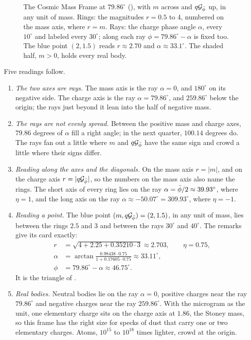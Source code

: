 \begin{figure}[tb]
\myfloatalign

\caption[The Cosmic Mass Frame]{The Cosmic Mass Frame at $79.86^\circ$ (), with $m$ across and $q\mathcal{G}_{\bar{\phi}}$ up, in any unit of mass. Rings: the magnitudes $r = 0.5$ to $4$, numbered on the mass axis, where $r = m$. Rays: the charge phase angle $\alpha$, every $10^\circ$ and labeled every $30^\circ$; along each ray $\phi = 79.86^\circ - \alpha$ is fixed too. The blue point $(2, 1.5)$ reads $r \approx 2.70$ and $\alpha \approx 33.1^\circ$. The shaded half, $m > 0$, holds every real body.}
\label{fig:sm-polar}
\end{figure}

Five readings follow.
\begin{enumerate}
  \item \emph{The two axes are rays.} The mass axis is the ray $\alpha = 0$, and $180^\circ$ on its negative side. The charge axis is the ray $\alpha = 79.86^\circ$, and $259.86^\circ$ below the origin; the rays just beyond it lean into the half of negative mass.
  \item \emph{The rays are not evenly spread.} Between the positive mass and charge axes, $79.86$ degrees of $\alpha$ fill a right angle; in the next quarter, $100.14$ degrees do. The rays fan out a little where $m$ and $q\mathcal{G}_{\bar{\phi}}$ have the same sign and crowd a little where their signs differ.
  \item \emph{Reading along the axes and the diagonals.} On the mass axis $r = |m|$, and on the charge axis $r = |q\mathcal{G}_{\bar{\phi}}|$, so the numbers on the mass axis also name the rings. The short axis of every ring lies on the ray $\alpha = \bar{\phi}/2 \approx 39.93^\circ$, where $\eta = 1$, and the long axis on the ray $\alpha \approx -50.07^\circ = 309.93^\circ$, where $\eta = -1$.
  \item \emph{Reading a point.} The blue point $(m, q\mathcal{G}_{\bar{\phi}}) = (2, 1.5)$, in any unit of mass, lies between the rings $2.5$ and $3$ and between the rays $30^\circ$ and $40^\circ$. The remarks give its card exactly:
  \begin{align*}
  r &= \sqrt{4 + 2.25 + 0.35210 \cdot 3} \approx 2.703, \qquad \eta = 0.75, \\
  \alpha &= \arctan\frac{0.98438 \cdot 0.75}{1 + 0.17605 \cdot 0.75} \approx 33.11^\circ, \\
  \phi &= 79.86^\circ - \alpha \approx 46.75^\circ.
  \end{align*}
  It is the triangle of .
  \item \emph{Real bodies.} Neutral bodies lie on the ray $\alpha = 0$, positive charges near the ray $79.86^\circ$ and negative charges near the ray $259.86^\circ$. With the microgram as the unit, one elementary charge sits on the charge axis at $1.86$, the Stoney mass, so this frame has the right size for specks of dust that carry one or two elementary charges. Atoms, $10^{15}$ to $10^{18}$ times lighter, crowd at the origin.
\end{enumerate}

